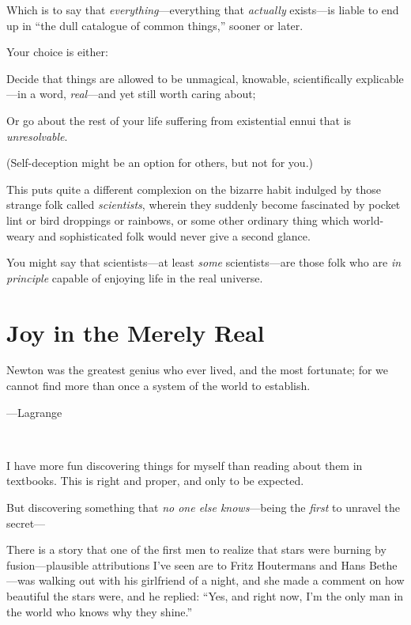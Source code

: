 {
 Which is to say that \textit{everything}{}---everything that
\textit{actually} exists---is liable to end up in
``the dull catalogue of common
things,'' sooner or later.}

{
 Your choice is either:}

{
 Decide that things are allowed to be unmagical, knowable,
scientifically explicable---in a word, \textit{real}{}---and yet still
worth caring about;}

{
 Or go about the rest of your life suffering from existential ennui
that is \textit{unresolvable}.}

{
 (Self-deception might be an option for others, but not for you.)}

{
 This puts quite a different complexion on the bizarre habit
indulged by those strange folk called \textit{scientists}, wherein they
suddenly become fascinated by pocket lint or bird droppings or
rainbows, or some other ordinary thing which world-weary and
sophisticated folk would never give a second glance.}

{
 You might say that scientists---at least \textit{some}
scientists---are those folk who are \textit{in principle} capable of
enjoying life in the real universe.}

\myendsectiontext

\chapter{Joy in the Merely Real}


{
 Newton was the greatest genius who ever lived, and the most
fortunate; for we cannot find more than once a system of the world to
establish.}

{\raggedleft
 {}---Lagrange
\par}


\bigskip

{
 ~}

{
 I have more fun discovering things for myself than reading about
them in textbooks. This is right and proper, and only to be expected.}

{
 But discovering something that \textit{no one else
knows}{}---being the \textit{first} to unravel the secret---}

{
 There is a story that one of the first men to realize that stars
were burning by fusion---plausible attributions I've
seen are to Fritz Houtermans and Hans Bethe{}---was walking out with
his girlfriend of a night, and she made a comment on how beautiful the
stars were, and he replied: ``Yes, and right now,
I'm the only man in the world who knows why they
shine.''}

